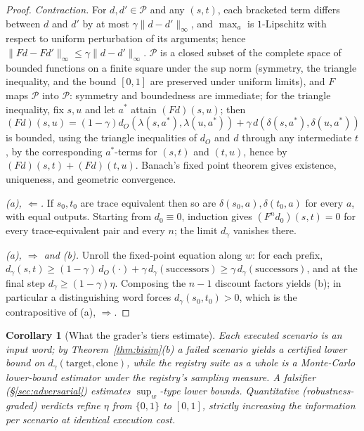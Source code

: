 \documentclass[11pt]{article}
\theoremstyle{plain}
\newtheorem{corollary}[theorem]{Corollary}
\theoremstyle{definition}
\theoremstyle{remark}
\newcommand{\cP}{\mathcal{P}}
\begin{document}
\begin{proof}
\emph{Contraction.} For $d, d' \in \cP$ and any $(s,t)$, each bracketed term
differs between $d$ and $d'$ by at most $\gamma \|d - d'\|_\infty$, and
$\max_a$ is $1$-Lipschitz with respect to uniform perturbation of its
arguments; hence $\|F d - F d'\|_\infty \le \gamma \|d - d'\|_\infty$.
$\cP$ is a closed subset of the complete space of bounded functions on a
finite square under the sup norm (symmetry, the triangle inequality, and the
bound $[0,1]$ are preserved under uniform limits), and $F$ maps $\cP$ into
$\cP$: symmetry and boundedness are immediate; for the triangle inequality,
fix $s,u$ and let $a^\ast$ attain $(Fd)(s,u)$; then
\[
  (Fd)(s,u) = (1-\gamma) d_O(\lambda(s,a^\ast), \lambda(u,a^\ast))
            + \gamma\, d(\delta(s,a^\ast), \delta(u,a^\ast))
\]
is bounded, using the triangle inequalities of $d_O$ and $d$ through any
intermediate $t$, by the corresponding $a^\ast$-terms for $(s,t)$ and
$(t,u)$, hence by $(Fd)(s,t) + (Fd)(t,u)$. Banach's fixed point theorem gives
existence, uniqueness, and geometric convergence.

\emph{(a), $\Leftarrow$.} If $s_0, t_0$ are trace equivalent then so are
$\delta(s_0,a), \delta(t_0,a)$ for every $a$, with equal outputs. Starting
from $d_0 \equiv 0$, induction gives $(F^n d_0)(s,t) = 0$ for every
trace-equivalent pair and every $n$; the limit $d_\gamma$ vanishes there.

\emph{(a), $\Rightarrow$ and (b).} Unroll the fixed-point equation along
$w$: for each prefix, $d_\gamma(s,t) \ge (1-\gamma)\, d_O(\cdot) + \gamma\,
d_\gamma(\text{successors}) \ge \gamma\, d_\gamma(\text{successors})$, and at
the final step $d_\gamma \ge (1-\gamma)\eta$. Composing the $n-1$ discount
factors yields (b); in particular a distinguishing word forces
$d_\gamma(s_0,t_0) > 0$, which is the contrapositive of (a),
$\Rightarrow$.
\end{proof}

\begin{corollary}[What the grader's tiers estimate]\label{cor:estimators}
Each executed scenario is an input word; by Theorem~\ref{thm:bisim}(b) a
failed scenario yields a \emph{certified lower bound} on
$d_\gamma(\mathrm{target}, \mathrm{clone})$, while the registry suite as a
whole is a Monte-Carlo lower-bound estimator under the registry's sampling
measure. A falsifier (\S\ref{sec:adversarial}) estimates
$\sup_w$-type lower bounds. Quantitative (robustness-graded) verdicts refine
$\eta$ from $\{0,1\}$ to $[0,1]$, strictly increasing the information per
scenario at identical execution cost.
\end{corollary}
\end{document}

